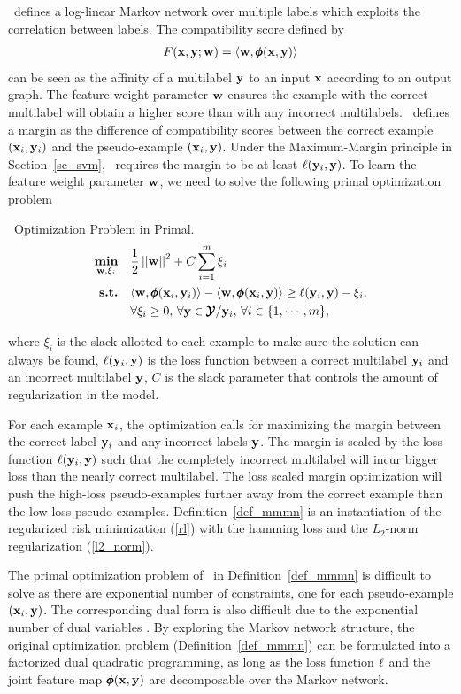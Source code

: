 {\mmmn\ defines a log-linear Markov network over multiple labels which exploits the correlation between labels.
The compatibility score defined by 
\begin{align}
	F(\mathbf {x},\mathbf {y};\mathbf {w}) = \langle \mathbf {w}, \pmb \phi(\mathbf {x},\mathbf {y}) \rangle \label{mmmn_score}
\end{align}
can be seen as the affinity of a multilabel $\mathbf {y}$ to an input $\mathbf {x}$ according to an output graph.
The feature weight parameter $\mathbf {w}$ ensures the example with the correct multilabel will obtain a higher score than with any incorrect multilabels.
\mmmn\ defines a margin as the difference of compatibility scores between the correct example $(\mathbf {x}_i,\mathbf {y}_i)$ and the pseudo-example $(\mathbf {x}_i,\mathbf {y})$.
Under the Maximum-Margin principle in Section~\ref{sc_svm}, \mmmn\ requires the margin to be at least $\mathbf {\ell}(\mathbf {y}_i,{\mathbf {y}})$.
To learn the feature weight parameter $\mathbf {w}$, we need to solve the following primal optimization problem
\begin{definition}{\mmmn\ Optimization Problem in Primal.}\label{def_mmmn}
	\begin{align*}
		\underset{\mathbf {w},\mathbf{\xi}_i}{\textbf{min}} & \quad\frac{1}{2}\left|\left| \mathbf {w} \right|\right|^2 + C\sum_{i=1}^{m}\xi_i \\
		\textbf{s.t.} & \quad\langle \mathbf {w}, \pmb \phi(\mathbf {x}_i,\mathbf {y}_i) \rangle - \langle \mathbf {w}, \pmb \phi(\mathbf {x}_i,\mathbf {y}) \rangle \ge \mathbf {\ell}(\mathbf {y}_i,\mathbf {y})-\xi_i,\\
		& \quad \forall \xi_i\ge0,\, \forall \mathbf {y}\in\pmb {\mathcal{Y}}/\mathbf {y}_i,\, \forall i\in\{1,\cdots,m\},
	\end{align*}
\end{definition}
\noindent
where $\xi_i$ is the slack allotted to each example to make sure the solution can always be found, $\mathbf {\ell}(\mathbf {y}_i,\mathbf {y})$ is the loss function between a correct multilabel $\mathbf {y}_i$ and an incorrect multilabel $\mathbf {y}$, $C$ is the slack parameter that controls the amount of regularization in the model.

For each example $\mathbf {x}_i$, the optimization calls for maximizing the margin between the correct label $\mathbf {y}_i$ and any incorrect labels $\mathbf {y}$.
The margin is scaled by the loss function $\mathbf {\ell}(\mathbf {y}_i,{\mathbf {y}})$ such that the completely incorrect multilabel will incur bigger loss than the nearly correct multilabel.
The loss scaled margin optimization will push the high-loss pseudo-examples further away from the correct example than the low-loss pseudo-examples.
Definition~\ref{def_mmmn} is an instantiation of the regularized risk minimization (\ref{rl}) with the hamming loss and the $L_2$-norm regularization (\ref{l2_norm}).

The primal optimization problem of \mmmn\ in Definition~\ref{def_mmmn} is difficult to solve as there are exponential number of constraints, one for each pseudo-example $(\mathbf {x}_i,\mathbf {y})$.
The corresponding dual form is also difficult due to the exponential number of dual variables \citep{Taskar04max}.
By exploring the Markov network structure, the original optimization problem (Definition~\ref{def_mmmn}) can be formulated into a factorized dual quadratic programming, as long as the loss function $\mathbf {\ell}$ and the joint feature map $\pmb \phi(\mathbf {x},\mathbf {y})$ are decomposable over the Markov network.

}
